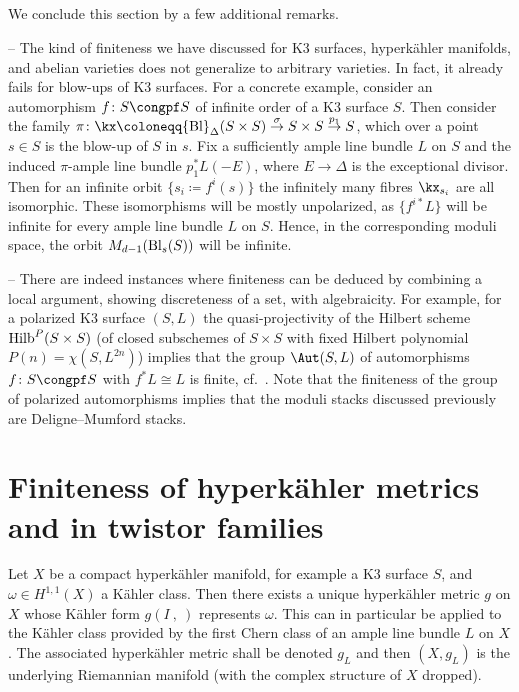 \subsection{}\label{sec:explainGT}
We conclude this section by a few additional remarks.
\smallskip

-- The kind of finiteness we have discussed for K3 surfaces, hyperk\"ahler manifolds, and abelian varieties does not generalize to arbitrary varieties. In fact, it already fails for blow-ups of K3 surfaces. For a concrete example, consider an automorphism $f\colon S\congpf S$ of infinite order of a K3 surface $S$. Then consider the family $\pi\colon\kx\coloneqq {\rm Bl}_\Delta(S\times S)\stackrel{\sigma}{\to} S\times S\stackrel{p_1}{\to}S$, which over a point $s\in S$ is the blow-up of $S$ in $s$. Fix a sufficiently ample line bundle $L$ on $S$ and the induced $\pi$-ample line bundle $p_1^*L(-E)$, where $E\to\Delta$ is the exceptional divisor. Then for an infinite orbit $\{s_i\coloneqq f^{i}(s)\}$ the infinitely many fibres $\kx_{s_i}$ are all isomorphic. These isomorphisms will be mostly unpolarized, as $\{f^{i\ast}L\}$ will be infinite for every ample line bundle $L$ on $S$. Hence, in the corresponding moduli space, the orbit $M_{d-1}({\rm Bl}_s(S))$ will be infinite.

\smallskip

-- There are indeed instances where finiteness can be deduced by combining a local argument, showing discreteness of a set, with algebraicity. For example, for a polarized K3 surface $(S,L)$ the quasi-projectivity of the Hilbert scheme ${\rm Hilb}^{P}(S\times S)$ (of closed subschemes of $S\times S$ with fixed Hilbert polynomial $P(n)=\chi(S,L^{2n})$) implies that the group $\Aut(S,L)$ of automorphisms $f\colon S\congpf S$ with $f^*L\cong L$ is finite, cf.~\cite[Chapter~5]{HuyK3}. Note that the finiteness of the group of polarized automorphisms implies that the moduli stacks discussed previously are Deligne--Mumford stacks.


\section{Finiteness of hyperk\"ahler metrics and in twistor families}

Let $X$ be a compact hyperk\"ahler manifold, for example a K3 surface $S$, and $\omega\in H^{1,1}(X)$ a K\"ahler class. Then there exists a unique hyperk\"ahler metric $g$ on $X$ whose K\"ahler form $g(I~,~)$ represents $\omega$. This can in particular be applied to the K\"ahler class provided by the first Chern class of an ample line bundle $L$ on $X$. The associated hyperk\"ahler metric shall be denoted $g_L$ and then $(X,g_L)$ is the underlying Riemannian manifold (with the complex structure of $X$ dropped).

